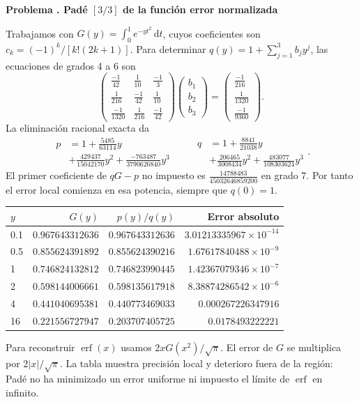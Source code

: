 \documentclass[11pt,a4paper]{article}
\newcommand{\dd}{\,\mathrm d}
\theoremstyle{definition}
\DeclareMathOperator{\erf}{erf}
\newcounter{problema}
\newenvironment{resuelto}[1]{\refstepcounter{problema}\par\medskip\Needspace{6\baselineskip}\textbf{Problema \theproblema. #1}\par}{\par\medskip}
\begin{document}
\begin{resuelto}{Padé $[3/3]$ de la función error normalizada}
Trabajamos con $G(y)=\int_0^1e^{-yt^2}\dd t$, cuyos coeficientes son $c_k=(-1)^k/[k!(2k+1)]$. Para determinar $q(y)=1+\sum_{j=1}^{3}b_jy^j$, las ecuaciones de grados 4 a 6 son
\[
\begin{pmatrix}\frac{-1}{42}&\frac{1}{10}&\frac{-1}{3}\\\frac{1}{216}&\frac{-1}{42}&\frac{1}{10}\\\frac{-1}{1320}&\frac{1}{216}&\frac{-1}{42}\end{pmatrix}
\begin{pmatrix}b_{1}\\b_{2}\\b_{3}\end{pmatrix}
=\begin{pmatrix}\frac{-1}{216}\\\frac{1}{1320}\\\frac{-1}{9360}\end{pmatrix}.
\]
La eliminación racional exacta da
\[
\begin{aligned}p&=1+\frac{5485}{63114}y\\&+\frac{429437}{15042170}y^{2}+\frac{-763487}{3790626840}y^{3}\end{aligned}
\qquad \begin{aligned}q&=1+\frac{8841}{21038}y\\&+\frac{206465}{3008434}y^{2}+\frac{483077}{108303624}y^{3}\end{aligned}.
\]
El primer coeficiente de $qG-p$ no impuesto es $\frac{14788483}{45032646859200}$ en grado 7. Por tanto el error local comienza en esa potencia, siempre que $q(0)=1$.

\begin{center}\small\begin{tabular}{lrrr}
\toprule
$y$ & $G(y)$ & $p(y)/q(y)$ & Error absoluto\\\midrule
0.1 & $0.967643312636$ & $0.967643312636$ & $3.01213335967\times10^{-14}$\\
0.5 & $0.855624391892$ & $0.855624390216$ & $1.67617840488\times10^{-9}$\\
1 & $0.746824132812$ & $0.746823990445$ & $1.42367079346\times10^{-7}$\\
2 & $0.598144006661$ & $0.598135617918$ & $8.38874286542\times10^{-6}$\\
4 & $0.441040695381$ & $0.440773469033$ & $0.000267226347916$\\
16 & $0.221556727947$ & $0.203707405725$ & $0.0178493222221$\\
\bottomrule\end{tabular}\end{center}

Para reconstruir $\erf(x)$ usamos $2xG(x^2)/\sqrt\pi$. El error de $G$ se multiplica por $2|x|/\sqrt\pi$. La tabla muestra precisión local y deterioro fuera de la región: Padé no ha minimizado un error uniforme ni impuesto el límite de $\erf$ en infinito.
\end{resuelto}
\end{document}
